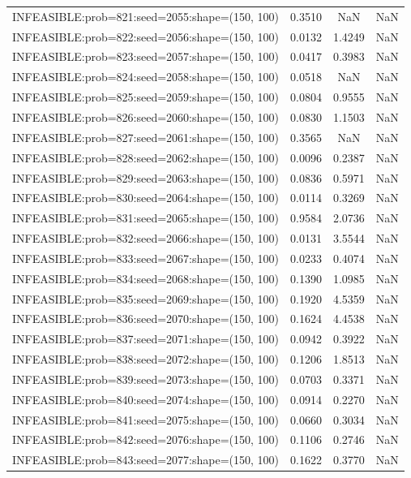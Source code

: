 \begin{longtable}{lccc}
INFEASIBLE:prob=821:seed=2055:shape=(150, 100) & 0.3510 &     NaN &    NaN \\
INFEASIBLE:prob=822:seed=2056:shape=(150, 100) & 0.0132 &  1.4249 &    NaN \\
INFEASIBLE:prob=823:seed=2057:shape=(150, 100) & 0.0417 &  0.3983 &    NaN \\
INFEASIBLE:prob=824:seed=2058:shape=(150, 100) & 0.0518 &     NaN &    NaN \\
INFEASIBLE:prob=825:seed=2059:shape=(150, 100) & 0.0804 &  0.9555 &    NaN \\
INFEASIBLE:prob=826:seed=2060:shape=(150, 100) & 0.0830 &  1.1503 &    NaN \\
INFEASIBLE:prob=827:seed=2061:shape=(150, 100) & 0.3565 &     NaN &    NaN \\
INFEASIBLE:prob=828:seed=2062:shape=(150, 100) & 0.0096 &  0.2387 &    NaN \\
INFEASIBLE:prob=829:seed=2063:shape=(150, 100) & 0.0836 &  0.5971 &    NaN \\
INFEASIBLE:prob=830:seed=2064:shape=(150, 100) & 0.0114 &  0.3269 &    NaN \\
INFEASIBLE:prob=831:seed=2065:shape=(150, 100) & 0.9584 &  2.0736 &    NaN \\
INFEASIBLE:prob=832:seed=2066:shape=(150, 100) & 0.0131 &  3.5544 &    NaN \\
INFEASIBLE:prob=833:seed=2067:shape=(150, 100) & 0.0233 &  0.4074 &    NaN \\
INFEASIBLE:prob=834:seed=2068:shape=(150, 100) & 0.1390 &  1.0985 &    NaN \\
INFEASIBLE:prob=835:seed=2069:shape=(150, 100) & 0.1920 &  4.5359 &    NaN \\
INFEASIBLE:prob=836:seed=2070:shape=(150, 100) & 0.1624 &  4.4538 &    NaN \\
INFEASIBLE:prob=837:seed=2071:shape=(150, 100) & 0.0942 &  0.3922 &    NaN \\
INFEASIBLE:prob=838:seed=2072:shape=(150, 100) & 0.1206 &  1.8513 &    NaN \\
INFEASIBLE:prob=839:seed=2073:shape=(150, 100) & 0.0703 &  0.3371 &    NaN \\
INFEASIBLE:prob=840:seed=2074:shape=(150, 100) & 0.0914 &  0.2270 &    NaN \\
INFEASIBLE:prob=841:seed=2075:shape=(150, 100) & 0.0660 &  0.3034 &    NaN \\
INFEASIBLE:prob=842:seed=2076:shape=(150, 100) & 0.1106 &  0.2746 &    NaN \\
INFEASIBLE:prob=843:seed=2077:shape=(150, 100) & 0.1622 &  0.3770 &    NaN \\

\end{longtable}

